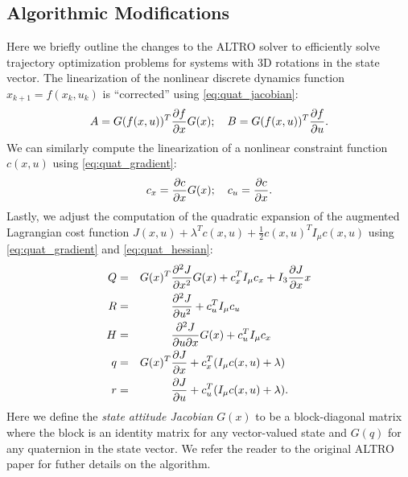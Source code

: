 \documentclass[letterpaper, 10 pt, conference]{ieeeconf}  %
\newcommand{\half}{\frac{1}{2}}
\newcommand{\R}{\mathbb{R}}
\begin{document}
    \subsection{Algorithmic Modifications}
    Here we briefly outline the changes to the ALTRO solver \cite{howell2019altro} to 
    efficiently solve trajectory optimization problems for systems with 3D rotations in the
    state vector. 
    The linearization of the nonlinear discrete dynamics function $x_{k+1} = f(x_k,u_k)$ is 
    ``corrected'' using \ref{eq:quat_jacobian}:
    \begin{equation}
        A = G(f(x,u))^T \pdv{f}{x} G(x); \quad B = G(f(x,u))^T \pdv{f}{u}.
    \end{equation}
    We can similarly compute the linearization of a nonlinear constraint function $c(x,u)$
    using \ref{eq:quat_gradient}:
    \begin{equation}
        c_x = \pdv{c}{x} G(x); \quad c_u = \pdv{c}{x}.
    \end{equation}
    Lastly, we adjust the computation of the quadratic expansion of the augmented
    Lagrangian cost function $J(x,u) + \lambda^T c(x,u) + \half c(x,u)^T I_\mu c(x,u)$
    using \ref{eq:quat_gradient} and \ref{eq:quat_hessian}:
    \begin{subequations}
        \begin{align}
            Q &= & G(x)^T & \pdv[2]{J}{x} G(x) + c_x^T I_\mu c_x + I_3 \pdv{J}{x} x \\
            R &= &        & \pdv[2]{J}{u}      + c_u^T I_\mu c_u \\
            H &= &        & \pdv{J}{u}{x} G(x) + c_u^T I_\mu c_x \\
            q &= & G(x)^T & \pdv{J}{x} + c_x^T (I_\mu c(x,u) + \lambda) \\
            r &= &        & \pdv{J}{u} + c_u^T (I_\mu c(x,u) + \lambda).
        \end{align}
    \end{subequations}
    Here we define the \textit{state attitude Jacobian} $G(x)$ to be a block-diagonal
    matrix where the block is an identity matrix for any vector-valued state and $G(q)$ for
    any quaternion in the state vector. We refer the reader to the original ALTRO paper 
    \cite{howell2019altro} for futher details on the algorithm.
\end{document}
